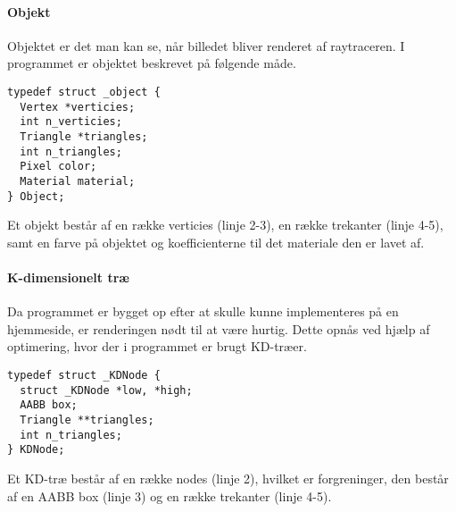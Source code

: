 \paragraph{Objekt}
Objektet er det man kan se, når billedet bliver renderet af raytraceren. I programmet er objektet beskrevet på følgende måde.

\begin{lstlisting}[style=Cstyle, caption=Structs til objektet]
typedef struct _object {
  Vertex *verticies;
  int n_verticies;
  Triangle *triangles;
  int n_triangles;
  Pixel color;
  Material material;
} Object;
\end{lstlisting}

Et objekt består af en række verticies (linje 2-3), en række trekanter (linje 4-5), samt en farve på objektet og koefficienterne til det materiale den er lavet af.

\paragraph{K-dimensionelt træ}
Da programmet er bygget op efter at skulle kunne implementeres på en hjemmeside, er renderingen nødt til at være hurtig. Dette opnås ved hjælp af optimering, hvor der i programmet er brugt KD-træer.

\begin{lstlisting}[style=Cstyle, caption=Struct til KDNode]
typedef struct _KDNode {
  struct _KDNode *low, *high;
  AABB box;
  Triangle **triangles;
  int n_triangles;
} KDNode;
\end{lstlisting}

Et KD-træ består af en række nodes (linje 2), hvilket er forgreninger, den består af en AABB box (linje 3) og en række trekanter (linje 4-5).